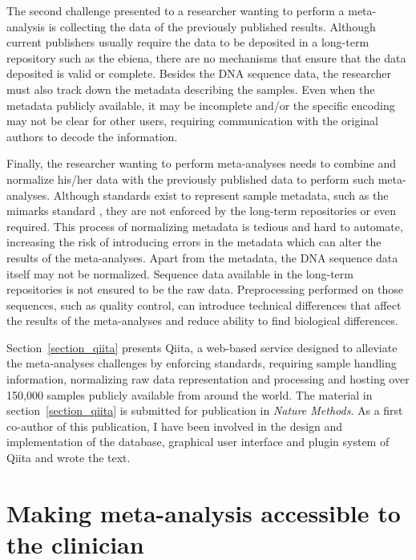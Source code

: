 \documentclass[12pt,chapterheads]{ucsd}
\begin{document}
The second challenge presented to a researcher wanting to perform a meta-analysis
is collecting the data of the previously published results. Although current publishers
usually require the data to be deposited in a long-term repository such as
the \gls{ebiena}, there are no mechanisms that ensure that the data deposited is valid
or complete. Besides the DNA sequence data, the researcher must also track down
the metadata describing the samples. Even when the metadata publicly available,
it may be incomplete and/or the specific encoding may not
be clear for other users, requiring communication with the original authors to
decode the information.

Finally, the researcher wanting to perform meta-analyses needs to combine and normalize
his/her data with the previously published data to perform such meta-analyses.
Although standards exist to represent sample metadata, such as the \gls{mimarks} standard
\cite{Yilmaz2011}, they are not enforced by the long-term repositories or even required.
This process of normalizing metadata is tedious and hard to automate, increasing
the risk of introducing errors in the metadata which can alter the results
of the meta-analyses. Apart from the metadata, the DNA sequence data itself may
not be normalized. Sequence data available in the long-term repositories is not ensured
to be the raw data. Preprocessing performed on those
sequences, such as quality control, can introduce technical differences that affect
the results of the meta-analyses and reduce ability to find biological differences.

Section~\ref{section_qiita} presents Qiita, a web-based service designed to
alleviate the meta-analyses challenges by enforcing standards, requiring sample
handling information, normalizing raw data representation and processing and hosting
over 150,000 samples publicly available from around the world. The material in section~\ref{section_qiita}
is submitted for publication in \textsl{Nature Methods}. As a first
co-author of this publication, I have been involved in the design and implementation of
the database, graphical user interface and plugin system of Qiita and wrote the text.



\chapter{Making meta-analysis accessible to the clinician}\label{chapter_rapid_response}
\glsresetall
\end{document}
